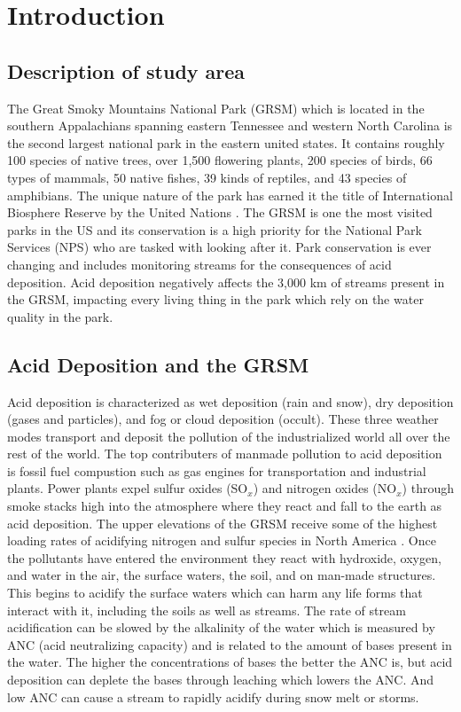 \chapter{Introduction} \label{ch:intro}

\section{Description of study area}

The Great Smoky Mountains National Park (GRSM) which is located in the southern Appalachians spanning eastern Tennessee and western North Carolina is the second largest national park in the eastern united states.
It contains roughly 100 species of native trees, over 1,500 flowering plants, 200 species of birds, 66 types of mammals, 50 native fishes, 39 kinds of reptiles, and 43 species of amphibians.
The unique nature of the park has earned it the title of  International Biosphere Reserve by the United Nations \citep{NPS}.	
The GRSM is one the most visited parks in the US and its conservation is a high priority for the National Park Services (NPS) who are tasked with looking after it.		
Park conservation is ever changing and  includes monitoring streams for the consequences of acid deposition.	
Acid deposition negatively affects the 3,000 km of streams present in the GRSM, impacting every living thing in the park which rely on the water quality in the park.  
	
\section{Acid Deposition and the GRSM}

Acid deposition is characterized as wet deposition (rain and snow), dry deposition (gases and particles), and fog or cloud deposition (occult).
These three weather modes transport and deposit the pollution of the industrialized world all over the rest of the world.
The top contributers of  manmade pollution to acid deposition is fossil fuel compustion such as gas engines for transportation and industrial plants.%
Power plants expel sulfur oxides (SO$_x$) and nitrogen oxides (NO$_x$) through smoke stacks high into the atmosphere where they react and fall to the earth as acid deposition.
The upper elevations of the GRSM receive some of the highest loading rates of acidifying nitrogen and sulfur species in North America \citep{johnson1992atmospheric}.  
Once the pollutants have entered the environment they react with hydroxide, oxygen, and water in the air, the surface waters, the soil, and on man-made structures\citep{board1983acid}.  
This begins to acidify the surface waters which can harm any life forms that interact with it, including the soils as well as streams.
The rate of stream acidification can be slowed by the alkalinity of the water which is measured by ANC (acid neutralizing capacity) and is related to the amount of bases present in the water.
The higher the concentrations of bases the better the ANC is, but acid deposition can deplete the bases through leaching which lowers the ANC.
And low ANC can cause a stream to rapidly acidify during snow melt or storms.

